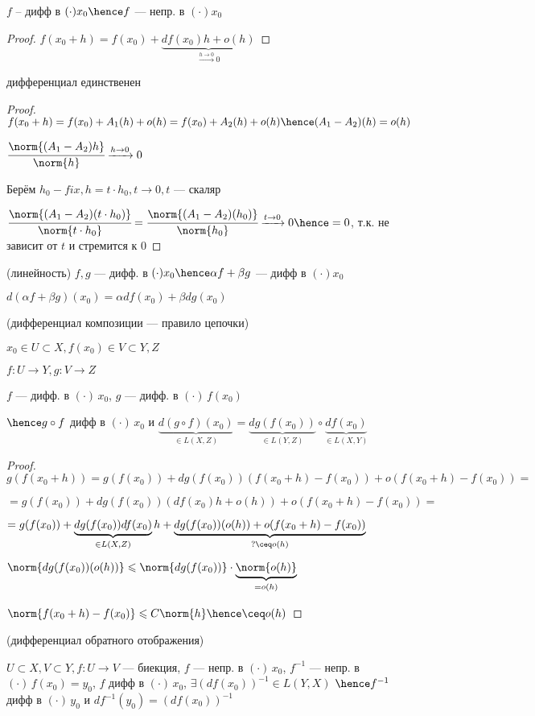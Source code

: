 \begin{properties}{}
    \item $f$ -- дифф в $(\cdot) x_0 \hence f $ --- непр. в $(\cdot) x_0$
    \begin{proof}
        $f(x_0 + h) = f(x_0) + \underbrace{df(x_0)h + o(h)}_{\xrightarrow{h \to 0}0}$
    \end{proof} 
    \item дифференциал единственен
    \begin{proof}
        $f(x_0 + h) = f(x_0) + A_1(h) + o(h) = f(x_0) + A_2(h) + o(h) \hence (A_1 - A_2)(h) = o(h)$

        $\cfrac{\norm{(A_1 - A_2)h}}{\norm{h}} \xrightarrow{h \to 0} 0$
    
        Берём $h_0 - fix, h = t \cdot h_0, t \to 0, t$ --- скаляр

        $\cfrac{\norm{(A_1 - A_2)(t \cdot h_0)}}{\norm{t \cdot h_0}}  
        = \cfrac{\norm{(A_1 - A_2)(h_0)}}{\norm{h_0}} \xrightarrow{t \to 0} 0 \hence 
        = 0$, т.к. не зависит от $t$ и стремится к $0$ 
    \end{proof}

    \item (линейность) $f, g$ --- дифф. в $(\cdot) x_0 \hence \alpha f + \beta g $ --- дифф  в $(\cdot) x_0 $
    
    $d(\alpha f + \beta g)(x_0) = \alpha df(x_0) + \beta dg(x_0)$

    \item (дифференциал композиции --- правило цепочки)
    
    $x_0 \in U \subset X, f(x_0) \in V \subset Y, Z$

    $f : U \to Y, g : V \to Z$

    $f$ --- дифф. в $(\cdot)\, x_0$, 
    $g$ --- дифф. в $(\cdot)\, f(x_0)$

    $\hence g \circ f $ дифф в $(\cdot)\, x_0$ и $\underbrace{d(g \circ f) (x_0)}_{\in L(X, Z)}  = \underbrace{dg(f(x_0))}_{\in L(Y, Z)} \circ \underbrace{df(x_0)}_{\in L(X, Y)}$
\newpage
    \begin{proof}
        $g(f(x_0 + h)) = g(f(x_0)) + dg(f(x_0))(f(x_0 + h) - f(x_0)) + o(f(x_0 + h) - f(x_0)) = $ 
        
        $= g(f(x_0)) + dg(f(x_0))(df(x_0)h + o(h)) + o(f(x_0 + h) - f(x_0)) = $


        $= g(f(x_0)) + \underbrace{dg(f(x_0)) df(x_0)}_{\in L(X, Z)} h + \underbrace{dg(f(x_0))(o(h)) + o(f(x_0 + h) - f(x_0))}_{?\ceq o(h)}$

        $\norm{dg(f(x_0))(o(h))} \leqslant \norm{dg(f(x_0))} \cdot \underbrace{\norm{o(h)}}_{=o(h)}$

        $\norm{f(x_0 + h) - f(x_0)} \leqslant C \norm{h} \hence \ceq o(h)$
    \end{proof}

    \item (дифференциал обратного отображения)
    
    $U \subset X, V \subset Y, f : U \to V $ --- биекция, $f $ --- непр. в $(\cdot)\, x_0$, $f^{-1}$ --- непр. в $(\cdot)\, f(x_0) = y_0$, $f$ дифф в $(\cdot) \, x_0$, $\exists (df(x_0))^{-1} \in L(Y, X)$
    $\hence f^{-1}$ дифф в $(\cdot)\, y_0$ и $df^{-1}(y_0) = (df(x_0)) ^ {-1}$
\end{properties}
